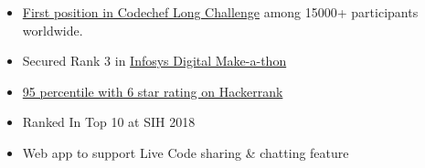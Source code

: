 
\begin{itemize}
    \item \href{https://www.codechef.com/users/curio}{\color{blue}First position in Codechef Long Challenge} among 15000+ participants worldwide.
    \item Secured Rank 3 in \href{https://drive.google.com/file/d/0B97_RhKWaPAOeUJpRHluMEliaHRZU05UWTZKbVJUalY3MElj/view?usp=sharing}{\color{blue}Infosys Digital Make-a-thon}
    \item \href{https://www.hackerrank.com/singhsanket143}{\color{blue}95 percentile with 6 star rating on Hackerrank}
    \item Ranked In Top 10 at SIH 2018
\end{itemize}







\begin{itemize}
\item Web app to support Live Code sharing \& chatting feature
\end{itemize}

